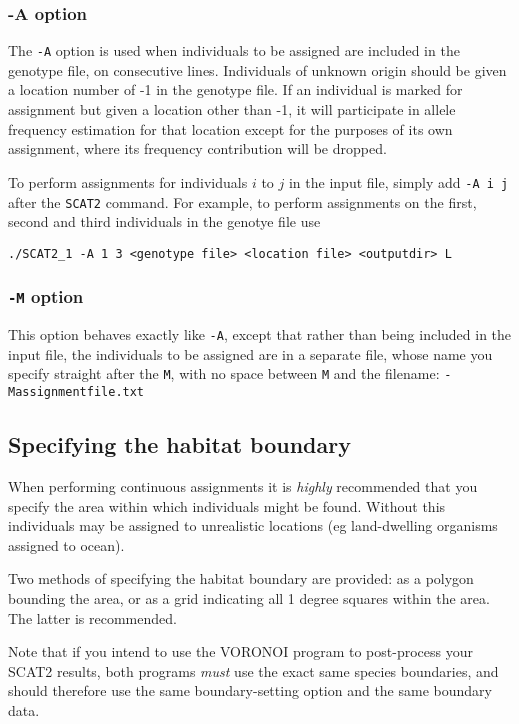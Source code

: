 \documentclass[10pt,titlepage,times,letterpaper]{article}
\def\SCAT{{\tt SCAT2} }
\begin{document}
\subsubsection{-A option}

The {\tt -A} option is used when
individuals to be assigned are included in the genotype file, on
consecutive lines. Individuals of unknown origin should be given a
location number of -1 in the genotype file.  If an individual is marked for
assignment but given a location other than -1, it will participate in
allele frequency estimation for that location except for the purposes
of its own assignment, where its frequency contribution will be dropped.

To perform assignments for individuals $i$ to $j$ in the input file,
simply add {\tt -A i j} after the \SCAT command. For example, to
perform assignments on the first, second and third individuals in the
genotye file use

{\tt ./SCAT2\_1 -A 1 3 <genotype file> <location file> <outputdir> L}

\subsubsection{{\tt -M} option} \label{assign2}

This option behaves exactly like {\tt -A}, except that rather than being
included in the input file, the individuals to be assigned are in a
separate file, whose name you specify straight after the {\tt M}, with
no space between {\tt M} and the filename:
 {\tt -Massignmentfile.txt} 
 
\subsection{Specifying the habitat boundary} \label{boundary}

When performing continuous assignments it is {\it highly}
recommended that you specify the area within which individuals might
be found. Without this individuals may be assigned to unrealistic
locations (eg land-dwelling organisms assigned to ocean).

Two methods of specifying the habitat boundary are provided:  as
a polygon bounding the area, or as a grid indicating all
1 degree squares within the area.  The latter is recommended.

Note that if you intend to use the VORONOI program to post-process your SCAT2
results, both programs {\it must} use the exact same species
boundaries, and should therefore use the same boundary-setting option
and the same boundary data.
\end{document}
